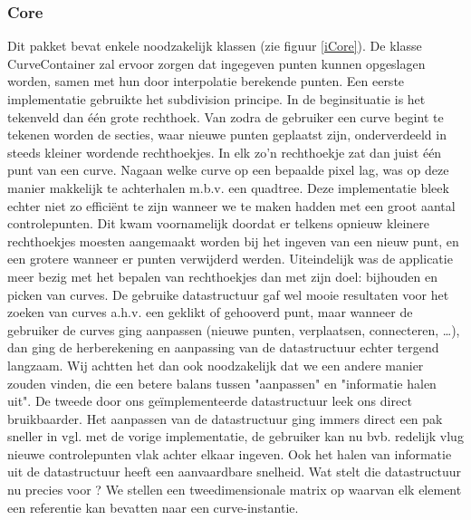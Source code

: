 \documentclass[a4paper,11pt,oneside, titlepage]{article}
\begin{document}
\subsubsection{Core}
\label{tcore}
Dit pakket bevat enkele noodzakelijk klassen (zie figuur \ref{iCore}).\newline \newline
De klasse CurveContainer zal ervoor zorgen dat ingegeven punten kunnen opgeslagen worden, samen
met hun door interpolatie berekende punten. \newline \newline
Een eerste implementatie gebruikte het subdivision principe. In de beginsituatie is het tekenveld
dan \'e\'en grote rechthoek. Van zodra de gebruiker een curve begint te tekenen worden de secties,
waar nieuwe punten geplaatst zijn, onderverdeeld in steeds kleiner wordende rechthoekjes. In elk zo'n
rechthoekje zat dan juist \'e\'en punt van een curve. Nagaan welke curve op een bepaalde pixel lag, was op deze manier
makkelijk te achterhalen m.b.v. een quadtree.\newline
Deze implementatie bleek echter niet zo effici\"ent te zijn wanneer we te maken hadden met een groot
aantal controlepunten. Dit kwam voornamelijk doordat er telkens opnieuw kleinere rechthoekjes
moesten aangemaakt worden bij het ingeven van een nieuw punt, en een grotere wanneer er punten verwijderd
werden. Uiteindelijk was de applicatie meer bezig met het bepalen van rechthoekjes dan met zijn
doel: bijhouden en picken van curves. De gebruike datastructuur gaf wel mooie resultaten voor het zoeken van curves a.h.v.
een geklikt of gehooverd punt, maar wanneer de gebruiker de curves ging aanpassen (nieuwe punten, verplaatsen, connecteren, \ldots), dan ging de 
herberekening en aanpassing van de datastructuur echter tergend langzaam. Wij achtten het dan ook noodzakelijk dat we een andere manier
zouden vinden, die een betere balans tussen "aanpassen" en "informatie halen uit". \newline \newline
De tweede door ons ge\"implementeerde datastructuur leek ons direct bruikbaarder. Het aanpassen van de datastructuur ging immers direct een pak sneller in vgl.
met de vorige implementatie, de gebruiker kan nu bvb. redelijk vlug nieuwe controlepunten vlak achter elkaar ingeven. Ook het halen van informatie uit de datastructuur heeft een aanvaardbare snelheid.
Wat stelt die datastructuur nu precies voor ? We stellen een tweedimensionale matrix op waarvan elk element een referentie kan bevatten naar een curve-instantie.
\end{document}
